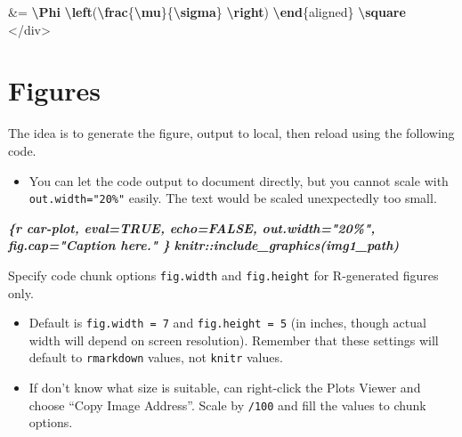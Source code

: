 \documentclass[
  a4paper,
  twoside,
  openright]{book}
\newenvironment{Shaded}{\begin{snugshade}}{\end{snugshade}}
\newcommand{\ExtensionTok}[1]{#1}
\newcommand{\InformationTok}[1]{\textcolor[rgb]{0.56,0.35,0.01}{\textbf{\textit{#1}}}}
\newcommand{\KeywordTok}[1]{\textcolor[rgb]{0.13,0.29,0.53}{\textbf{#1}}}
\newcommand{\NormalTok}[1]{#1}
\newcommand{\SpecialCharTok}[1]{\textcolor[rgb]{0.81,0.36,0.00}{\textbf{#1}}}
\newcommand{\SpecialStringTok}[1]{\textcolor[rgb]{0.31,0.60,0.02}{#1}}
\providecommand{\tightlist}{%
  \setlength{\itemsep}{0pt}\setlength{\parskip}{0pt}}
\theoremstyle{definition}
\theoremstyle{definition}
\theoremstyle{definition}
\theoremstyle{definition}
\theoremstyle{remark}
\begin{document}
\begin{Shaded}
\begin{Highlighting}[]
\SpecialStringTok{\&= }\SpecialCharTok{\textbackslash{}Phi}\SpecialStringTok{ }\SpecialCharTok{\textbackslash{}left}\SpecialStringTok{(}\SpecialCharTok{\textbackslash{}frac}\SpecialStringTok{\{}\SpecialCharTok{\textbackslash{}mu}\SpecialStringTok{\}\{}\SpecialCharTok{\textbackslash{}sigma}\SpecialStringTok{\} }\SpecialCharTok{\textbackslash{}right}\SpecialStringTok{) }
\KeywordTok{\textbackslash{}end}\NormalTok{\{}\ExtensionTok{aligned}\NormalTok{\}}\SpecialStringTok{  }\SpecialCharTok{\textbackslash{}square}
\SpecialStringTok{$$}
\NormalTok{\textasciigrave{}\textasciigrave{}\textasciigrave{}}
\NormalTok{\textless{}/div\textgreater{}}
\end{Highlighting}
\end{Shaded}

\section{Figures}\label{figures}

The idea is to generate the figure, output to local, then reload using the following code.

\begin{itemize}
\tightlist
\item
  You can let the code output to document directly, but you cannot scale with \texttt{out.width="20\%"} easily. The text would be scaled unexpectedly too small.
\end{itemize}

\begin{Shaded}
\begin{Highlighting}[]
\InformationTok{\textasciigrave{}\textasciigrave{}\textasciigrave{}\{r car{-}plot, eval=TRUE, echo=FALSE, out.width="20\%", fig.cap="Caption here." \}}
\InformationTok{knitr::include\_graphics(img1\_path) }
\InformationTok{\textasciigrave{}\textasciigrave{}\textasciigrave{}}
\end{Highlighting}
\end{Shaded}

Specify code chunk options \texttt{fig.width} and \texttt{fig.height} for R-generated figures only.

\begin{itemize}
\tightlist
\item
  Default is \texttt{fig.width\ =\ 7} and \texttt{fig.height\ =\ 5} (in inches, though actual width will depend on screen resolution). Remember that these settings will default to \texttt{rmarkdown} values, not \texttt{knitr} values.
\item
  If don't know what size is suitable, can right-click the Plots Viewer and choose ``Copy Image Address''. Scale by \texttt{/100} and fill the values to chunk options.
\end{itemize}
\end{document}
